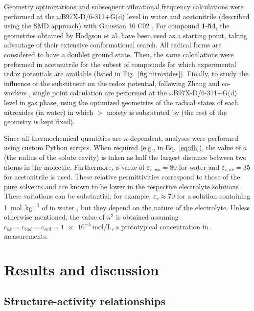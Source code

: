 \documentclass[review]{elsarticle}
\begin{document}
Geometry optimizations and subsequent vibrational frequency calculations were performed at the $\omega$B97X-D/6-311+G(d) level in water and acetonitrile (described using the SMD \cite{marenichUniversalSolvationModel2009} approach) with Gaussian 16 C02 \cite{g16}. For compound \textbf{1}-\textbf{54}, the geometries obtained by Hodgson et al. \cite{hodgsonOneElectronOxidationReduction2007} have been used as a starting point, taking advantage of their extensive conformational search. All radical forms are considered to have a doublet ground state. Then, the same calculations were preformed in acetonitrile for the subset of compounds for which experimental redox potentials are available (listed in Fig.~\ref{fig:nitroxides}). Finally, to study the influence of the substituent on the redox potential, following Zhang and co-workers \cite{zhangEffectHeteroatomFunctionality2018}, single point calculation are performed at the $\omega$B97X-D/6-311+G(d) level in gas phase, using the optimized geometries of  the radical states of each nitroxides (in water) in which $>$ moiety is substituted by  (the rest of the geometry is kept fixed).

Since all thermochemical quantities are $\kappa$-dependent, analyses were performed using custom Python scripts. When required (e.g., in Eq.~\eqref{eq:dh}), the value of $a$ (the radius of the solute cavity) is taken as half the largest distance between two atoms in the molecule. Furthermore, a value of $\varepsilon_{r,wa}=80$ for water and $\varepsilon_{r,ac}=35$ for acetonitrile is used. These relative permittivities correspond to those of the pure solvents and are known to be lower in the respective electrolyte solutions \cite{silvaTrueHuckelEquation2022}. These variations can be substantial; for example, $\varepsilon_r \approx 70$ for a solution containing \SI{1}{\mol\per\kilo\gram} of  in water \cite{kontogeorgisDebyeHuckelTheoryIts2018, silvaTrueHuckelEquation2022}, but they depend on the nature of the electrolyte.
Unless otherwise mentioned, the value of $\kappa^2$ is obtained assuming  $c_{ox} = c_{rad} = c_ {red} = \SI{1e-3}{\mole\per\liter}$, a prototypical concentration in measurements.

\clearpage

\section{Results and discussion} \label{sec:results}

\subsection{Structure-activity relationships} \label{sec:sar}
\end{document}
